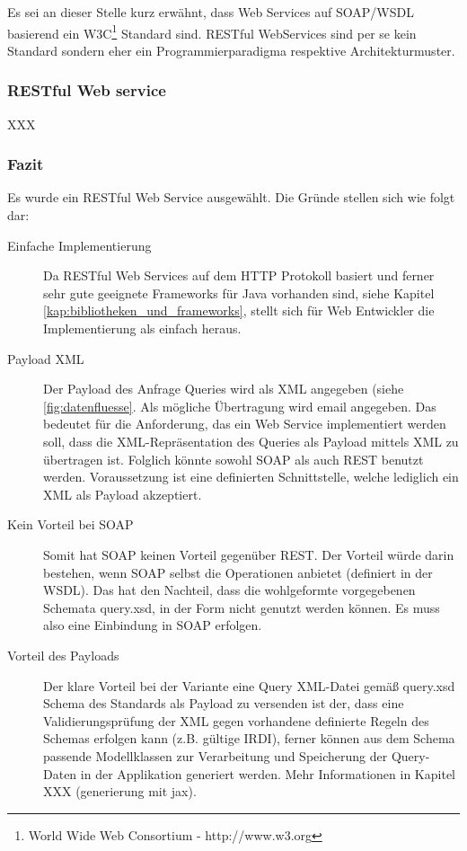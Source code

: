 Es sei an dieser Stelle kurz erwähnt, dass Web Services auf SOAP/WSDL basierend ein W3C\footnote{World Wide Web Consortium - http://www.w3.org} Standard sind. RESTful WebServices sind per se kein Standard sondern eher ein Programmierparadigma respektive Architekturmuster. 

\subsubsection{RESTful Web service}
XXX

\subsubsection{Fazit}
Es wurde ein RESTful Web Service ausgewählt. Die Gründe stellen sich wie folgt dar:

\begin{description}
\item[Einfache Implementierung] Da RESTful Web Services auf dem HTTP Protokoll basiert und ferner sehr gute geeignete Frameworks für Java vorhanden sind, siehe Kapitel \ref{kap:bibliotheken_und_frameworks}, stellt sich für Web Entwickler die Implementierung als einfach heraus.
\item[Payload XML] Der Payload des Anfrage Queries wird als XML angegeben (siehe \ref{fig:datenfluesse}. Als mögliche Übertragung wird email angegeben. Das bedeutet für die Anforderung, das ein Web Service  implementiert werden soll, dass die XML-Repräsentation des Queries als Payload mittels XML zu übertragen ist. Folglich könnte sowohl SOAP als auch REST benutzt werden. Voraussetzung ist eine definierten Schnittstelle, welche lediglich ein XML als Payload akzeptiert. 
\item[Kein Vorteil bei SOAP] Somit hat SOAP keinen Vorteil gegenüber REST. Der Vorteil würde darin bestehen, wenn SOAP selbst die Operationen anbietet (definiert in der WSDL). Das hat den Nachteil, dass die wohlgeformte vorgegebenen Schemata query.xsd, in der Form nicht genutzt werden können. Es muss also eine Einbindung in SOAP erfolgen. 
\item[Vorteil des Payloads] Der klare Vorteil bei der Variante eine Query XML-Datei gemäß query.xsd Schema des Standards als Payload zu versenden ist der, dass eine Validierungsprüfung der XML gegen vorhandene definierte Regeln des Schemas erfolgen kann (z.B. gültige IRDI), ferner können aus dem Schema passende Modellklassen zur Verarbeitung und Speicherung der Query-Daten in der Applikation generiert werden. Mehr Informationen in Kapitel XXX (generierung mit jax).  
\end{description}




